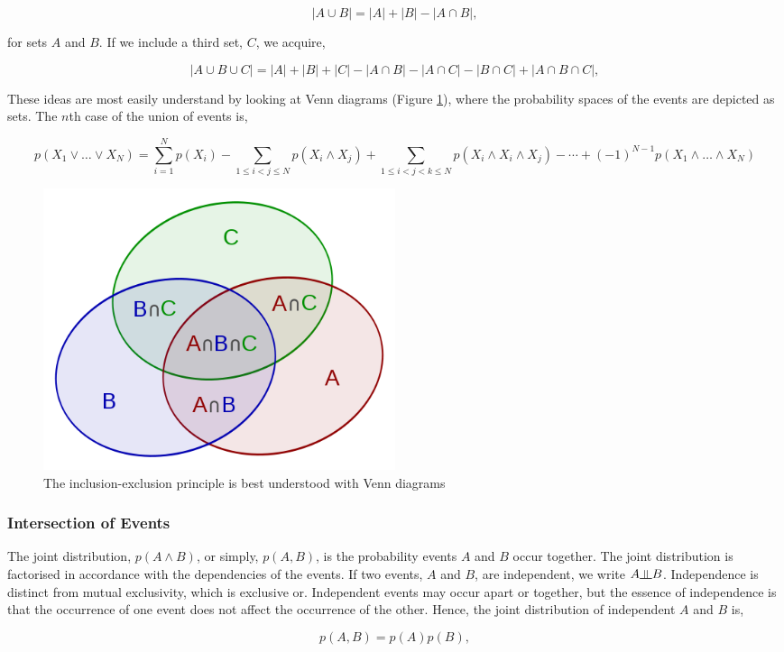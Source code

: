 \documentclass[11pt]{amsart}
\newcommand{\indep}{\rotatebox[origin=c]{90}{$\models$}}
\begin{document}
$$|A \cup B| = |A| + |B| - |A \cap B|,$$

for sets $A$ and $B$. If we include a third set, $C$, we acquire,

$$|A \cup B \cup C| = |A| + |B| + |C| - |A \cap B| - |A \cap C| - |B \cap C| + |A \cap B \cap C|,$$

These ideas are most easily understand by looking at Venn diagrams (Figure \ref{fig:inclusionexclusion}), where the probability spaces of the events are depicted as sets. The $n$th case of the union of events is,

$$p(X_1 \lor \dots \lor X_N) = \sum_{i = 1}^{N}p(X_i) - \sum_{1 \leq i < j \leq N}p(X_i \land X_j) + \sum_{1 \leq i < j < k \leq N}p(X_i \land X_i \land X_j) - \cdots + (-1)^{N-1}p(X_1 \land \dots \land X_N)$$

\begin{figure}[!ht]
\centering
\includegraphics[width=0.5\textwidth]{Figures/inclusionexclusion.png}
\caption{The inclusion-exclusion principle is best understood with Venn diagrams\cite{inclusionexclusion}}
\label{fig:inclusionexclusion}
\end{figure}

\subsubsection{Intersection of Events}

The joint distribution, $p(A \land B)$, or simply, $p(A, B)$, is the probability events $A$ and $B$ occur together. The joint distribution is factorised in accordance with the dependencies of the events. If two events, $A$ and $B$, are independent, we write $A \indep B$. Independence is distinct from mutual exclusivity, which is exclusive or. Independent events may occur apart or together, but the essence of independence is that the occurrence of one event does not affect the occurrence of the other. Hence, the joint distribution of independent $A$ and $B$ is,

$$p(A, B) = p(A)p(B),$$
\end{document}
